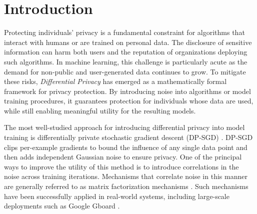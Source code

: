 \documentclass{article}
\theoremstyle{plain}
\theoremstyle{definition}
\theoremstyle{remark}
\begin{document}
\printAffiliationsAndNotice{}  %

\begin{abstract}
Differentially private stochastic gradient descent (DP-SGD) is the gold standard for training machine learning models with formal differential privacy guarantees. Several recent extensions improve its accuracy by introducing correlated noise across training iterations. Matrix factorization mechanisms are a prominent example, but they correlate noise across many iterations and require storing previously added noise vectors, leading to substantial memory overhead in some settings. In this work, we propose a new noise correlation strategy that correlates noise only with the immediately preceding iteration and cancels a controlled portion of it. Our method relies on noise regeneration using a pseudorandom noise generator, eliminating the need to store past noise. As a result, it requires no additional memory beyond standard DP-SGD. We show that the computational overhead is minimal and empirically demonstrate improved accuracy over DP-SGD.
\end{abstract}

\section{Introduction}
Protecting individuals’ privacy is a fundamental constraint for algorithms that interact with humans or are trained on personal data. The disclosure of sensitive information can harm both users and the reputation of organizations deploying such algorithms. In machine learning, this challenge is particularly acute as the demand for non-public and user-generated data continues to grow. To mitigate these risks, \textit{Differential Privacy} \citep{Dwork_DP_original} has emerged as a mathematically formal framework for privacy protection. By introducing noise into algorithms or model training procedures, it guarantees protection for individuals whose data are used, while still enabling meaningful utility for the resulting models.

The most well-studied approach for introducing differential privacy into model training is differentially private stochastic gradient descent (DP-SGD) \citep{Abadi}. DP-SGD clips per-example gradients to bound the influence of any single data point and then adds independent Gaussian noise to ensure privacy. One of the principal ways to improve the utility of this method is to introduce correlations in the noise across training iterations. Mechanisms that correlate noise in this manner are generally referred to as matrix factorization mechanisms \citep{Li_MF, Denisov, choquette2022multi, choquette2023amplified, kalinin2024, kalinin2025learningrate}. Such mechanisms have been successfully applied in real-world systems, including large-scale deployments such as Google Gboard \citep{xu2024advances}. 
\end{document}
